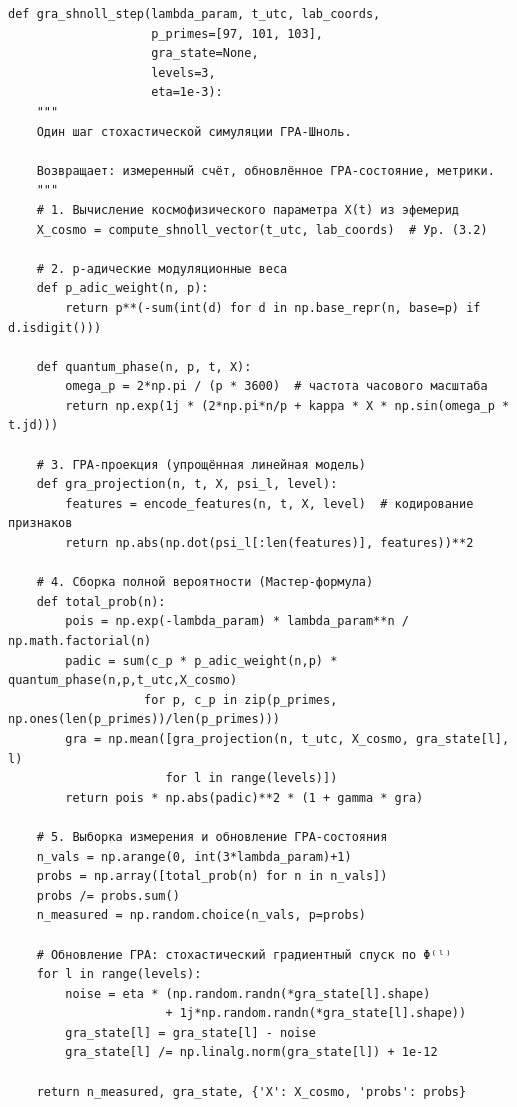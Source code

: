 \documentclass[12pt,a4paper]{article}
\theoremstyle{plain}
\theoremstyle{definition}
\theoremstyle{remark}
\begin{document}
\begin{lstlisting}[caption={Ядро симуляции: один шаг ГРА-Шноль}, label={lst:core-algorithm}]
def gra_shnoll_step(lambda_param, t_utc, lab_coords, 
                    p_primes=[97, 101, 103], 
                    gra_state=None, 
                    levels=3, 
                    eta=1e-3):
    """
    Один шаг стохастической симуляции ГРА-Шноль.
    
    Возвращает: измеренный счёт, обновлённое ГРА-состояние, метрики.
    """
    # 1. Вычисление космофизического параметра X(t) из эфемерид
    X_cosmo = compute_shnoll_vector(t_utc, lab_coords)  # Ур. (3.2)
    
    # 2. p-адические модуляционные веса
    def p_adic_weight(n, p):
        return p**(-sum(int(d) for d in np.base_repr(n, base=p) if d.isdigit()))
    
    def quantum_phase(n, p, t, X):
        omega_p = 2*np.pi / (p * 3600)  # частота часового масштаба
        return np.exp(1j * (2*np.pi*n/p + kappa * X * np.sin(omega_p * t.jd)))
    
    # 3. ГРА-проекция (упрощённая линейная модель)
    def gra_projection(n, t, X, psi_l, level):
        features = encode_features(n, t, X, level)  # кодирование признаков
        return np.abs(np.dot(psi_l[:len(features)], features))**2
    
    # 4. Сборка полной вероятности (Мастер-формула)
    def total_prob(n):
        pois = np.exp(-lambda_param) * lambda_param**n / np.math.factorial(n)
        padic = sum(c_p * p_adic_weight(n,p) * quantum_phase(n,p,t_utc,X_cosmo) 
                   for p, c_p in zip(p_primes, np.ones(len(p_primes))/len(p_primes)))
        gra = np.mean([gra_projection(n, t_utc, X_cosmo, gra_state[l], l) 
                      for l in range(levels)])
        return pois * np.abs(padic)**2 * (1 + gamma * gra)
    
    # 5. Выборка измерения и обновление ГРА-состояния
    n_vals = np.arange(0, int(3*lambda_param)+1)
    probs = np.array([total_prob(n) for n in n_vals])
    probs /= probs.sum()
    n_measured = np.random.choice(n_vals, p=probs)
    
    # Обновление ГРА: стохастический градиентный спуск по Φ⁽ˡ⁾
    for l in range(levels):
        noise = eta * (np.random.randn(*gra_state[l].shape) 
                      + 1j*np.random.randn(*gra_state[l].shape))
        gra_state[l] = gra_state[l] - noise
        gra_state[l] /= np.linalg.norm(gra_state[l]) + 1e-12
    
    return n_measured, gra_state, {'X': X_cosmo, 'probs': probs}
\end{lstlisting}
\end{document}
